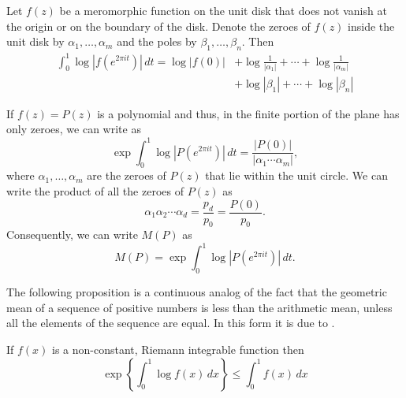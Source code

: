 \begin{proposition}[Jensen]
\label{Jensen:Formula:Prop}
Let $f(z)$ be a meromorphic function on the unit disk that does not vanish
at the origin or on the boundary of the disk.  Denote the zeroes of $f(z)$
inside the unit disk by $\alpha_{1}, \ldots, \alpha_{m}$ and the
poles by $\beta_{1}, \ldots, \beta_{n}$.  Then
\begin{equation}
\label{Jensen:Formula:Eq}
\begin{aligned}
\int_{0}^{1} \log \left|f(e^{2\pi i t})\right|\,dt = 
\log |f(0)| &+ \log \frac{1}{|\alpha_{1}|} + \cdots + 
                \log \frac{1}{|\alpha_{m}|} \\
       & + \log |\beta_{1}| + \cdots + \log |\beta_{n}|
\end{aligned}
\end{equation}
\end{proposition}

If $f(z) = P(z)$ is a polynomial and thus, in the finite portion of the 
plane has only zeroes, we can
write
 as
\begin{equation}
\label{Jensen:Formula:a:Eq}
\exp \int_{0}^{1} \log \left| P(e^{2\pi i t})\right| \, dt =
\frac{|P(0)|}{\left| \alpha_{1} \cdots \alpha_{m}\right|},
\end{equation}
where $\alpha_{1}, \ldots, \alpha_{m}$ are the zeroes of $P(z)$ that lie
within the unit circle.  We can write the product of all the zeroes
of $P(z)$ as
\[
\alpha_1 \alpha_2 \cdots \alpha_d = \frac{p_d}{p_0} =
\frac{P(0)}{p_0}.
\]
Consequently, we can write $M(P)$ as
\begin{equation} \label{PB:MPDef:Eq}
M(P) = \exp \int_{0}^{1} \log \left| P(e^{2\pi i t})\right| \, dt.
\end{equation}

The following proposition is a continuous analog of the fact that the
geometric mean of a sequence of positive numbers is less than the
arithmetic mean, unless all the elements of the sequence are equal.
In this form it is due to {\Jensen} \cite{Jensen1906-ak}.

\begin{proposition}[Jensen]
\label{Jensen:Inequality:Prop}
If $f(x)$ is a non-constant, Riemann integrable function then
\[
\exp \left\{ \int_0^1 \log f(x)\, dx\right\} \le \int_0^1 f(x) \, dx
\]
\end{proposition}

